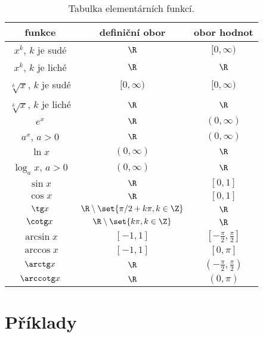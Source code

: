 \begin{table}[H]
    \centering
    \begin{tabular}{|c|c|c|}
        \hline
        \textbf{funkce} & \textbf{definiční obor} & \textbf{obor hodnot} \\
        \hline
        $x^k$, $k$ je sudé              & $\R$          & $[0, \infty)$ \\ 
        $x^k$, $k$ je liché             & $\R$          & $\R$ \\ 
        $\sqrt[k]{x}$, $k$ je sudé      & $[0, \infty)$ & $[0, \infty)$ \\
        $\sqrt[k]{x}$, $k$ je liché     & $\R$          & $\R$ \\
        \hline
        $e^x$                           & $\R$          & $(0, \infty)$ \\
        $a^x$, $a>0$                    & $\R$          & $(0, \infty)$ \\
        $\ln x$                         & $(0, \infty)$ & $\R$ \\
        $\log_a x$, $a>0$               & $(0, \infty)$ & $\R$ \\
        \hline
        $\sin x$                        & $\R$          & $[0,1]$ \\
        $\cos x$                        & $\R$          & $[0,1]$ \\
        $\tg x$                         & $\R \setminus \set{\pi/2 + k \pi, k \in \Z}$ & $\R$ \\
        $\cotg x$                       & $\R \setminus \set{k \pi, k \in \Z}$  & $\R$ \\
        \hline
        $\arcsin x$                     & $[-1,1]$      & $[-\frac{\pi}{2}, \frac{\pi}{2}]$ \\
        $\arccos x$                     & $[-1,1]$      & $[0,\pi]$ \\
        $\arctg x$                      & $\R$          & $(-\frac{\pi}{2}, \frac{\pi}{2})$ \\
        $\arccotg x$                    & $\R$          & $(0,\pi)$ \\
         \hline
    \end{tabular}
    \caption{Tabulka elementárních funkcí.}
    \label{tab:funkce}
\end{table}

\section*{Příklady}

